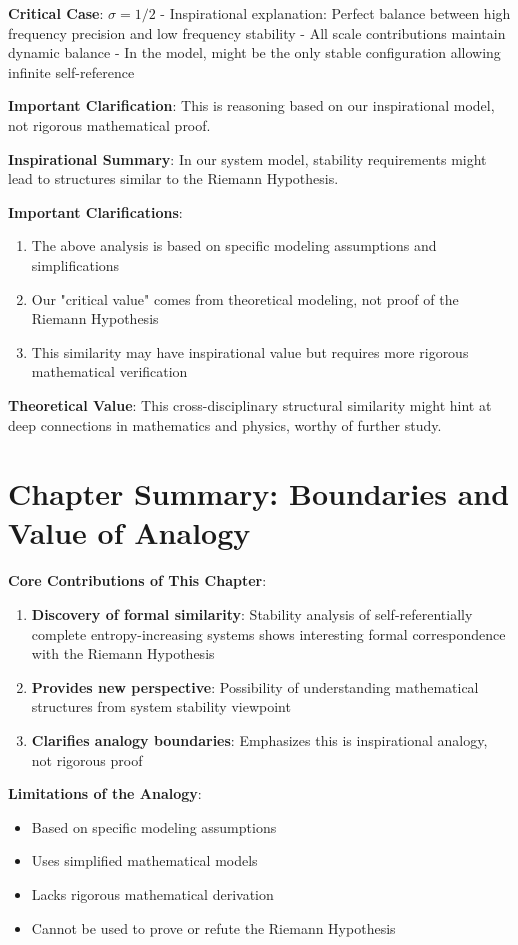    \textbf{Critical Case}: $\sigma = 1/2$
   - Inspirational explanation: Perfect balance between high frequency precision and low frequency stability
   - All scale contributions maintain dynamic balance
   - In the model, might be the only stable configuration allowing infinite self-reference
   
   \textbf{Important Clarification}: This is reasoning based on our inspirational model, not rigorous mathematical proof.

\textbf{Inspirational Summary}: In our system model, stability requirements might lead to structures similar to the Riemann Hypothesis.

\textbf{Important Clarifications}:
\begin{enumerate}
\item The above analysis is based on specific modeling assumptions and simplifications
\item Our "critical value" comes from theoretical modeling, not proof of the Riemann Hypothesis
\item This similarity may have inspirational value but requires more rigorous mathematical verification
\end{enumerate}

\textbf{Theoretical Value}: This cross-disciplinary structural similarity might hint at deep connections in mathematics and physics, worthy of further study.

\section{Chapter Summary: Boundaries and Value of Analogy}
\label{sec:ch04_riemann:chapter-summary-boundaries-and-value-of-analogy}

\textbf{Core Contributions of This Chapter}:
\begin{enumerate}
\item \textbf{Discovery of formal similarity}: Stability analysis of self-referentially complete entropy-increasing systems shows interesting formal correspondence with the Riemann Hypothesis
\item \textbf{Provides new perspective}: Possibility of understanding mathematical structures from system stability viewpoint
\item \textbf{Clarifies analogy boundaries}: Emphasizes this is inspirational analogy, not rigorous proof
\end{enumerate}

\textbf{Limitations of the Analogy}:
\begin{itemize}
\item Based on specific modeling assumptions
\item Uses simplified mathematical models
\item Lacks rigorous mathematical derivation
\item Cannot be used to prove or refute the Riemann Hypothesis
\end{itemize}

